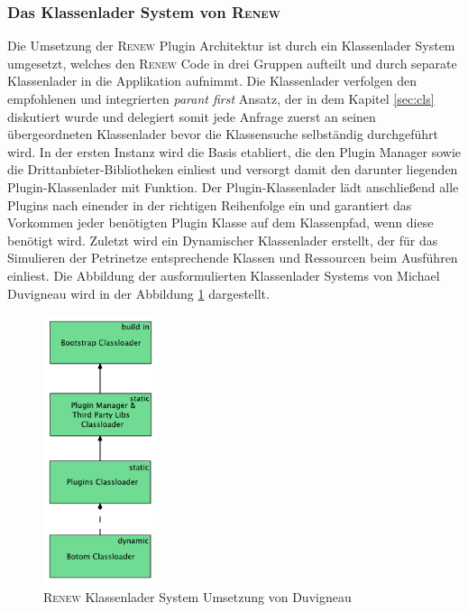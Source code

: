 		\subsubsection{Das Klassenlader System von \textsc{Renew}}
			Die Umsetzung der \textsc{Renew} Plugin Architektur ist durch ein Klassenlader System umgesetzt, welches den \textsc{Renew} Code in drei Gruppen aufteilt und durch separate Klassenlader in die Applikation aufnimmt. Die Klassenlader verfolgen den empfohlenen und integrierten \textit{parant first} Ansatz, der in dem Kapitel \ref{sec:cls} diskutiert wurde und delegiert somit jede Anfrage zuerst an seinen übergeordneten Klassenlader bevor die Klassensuche selbständig durchgeführt wird. \newline
			In der ersten Instanz wird die Basis etabliert, die den Plugin Manager sowie die Drittanbieter-Bibliotheken einliest und versorgt damit den darunter liegenden Plugin-Klassenlader mit Funktion. Der Plugin-Klassenlader lädt anschließend alle Plugins nach einender in der richtigen Reihenfolge ein und garantiert das Vorkommen jeder benötigten Plugin Klasse auf dem Klassenpfad, wenn diese benötigt wird. Zuletzt wird ein Dynamischer Klassenlader erstellt, der für das Simulieren der Petrinetze entsprechende Klassen und Ressourcen beim Ausführen einliest. \newline
			Die Abbildung der ausformulierten Klassenlader Systems von Michael Duvigneau wird in der Abbildung \ref{fig:classLoadDuv} dargestellt. \newline
			\begin{figure}[h!]
			\centering
				\includegraphics[width=0.3\textwidth]{material/images/Classloader-Hierarhie-Renew.pdf}
				\caption{\textsc{Renew} Klassenlader System Umsetzung von Duvigneau \cite{Duvigneau09}}
				\label{fig:classLoadDuv}
			\end{figure}
